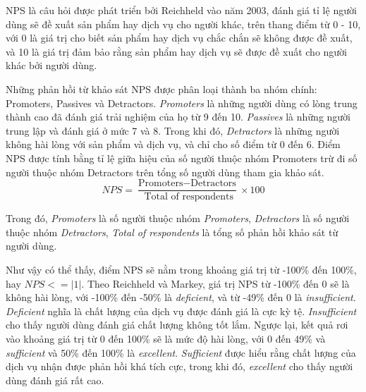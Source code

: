 NPS là câu hỏi được phát triển bởi Reichheld vào năm 2003, đánh giá tỉ lệ người dùng sẽ đề xuất sản phẩm hay dịch vụ cho người khác, trên thang điểm từ 0 - 10, với 0 là giá trị cho biết sản phẩm hay dịch vụ chắc chắn sẽ không được đề xuất, và 10 là giá trị đảm bảo rằng sản phẩm hay dịch vụ sẽ được đề xuất cho người khác bởi người dùng.
\par
Những phản hồi từ khảo sát NPS được phân loại thành ba nhóm chính: Promoters, Passives và Detractors. \emph{Promoters} là những người dùng có lòng trung thành cao đã đánh giá trải nghiệm của họ từ 9 đến 10. \emph{Passives} là những người trung lập và đánh giá ở mức 7 và 8. Trong khi đó, \emph{Detractors} là những người không hài lòng với sản phẩm và dịch vụ, và chỉ cho số điểm từ 0 đến 6. Điểm NPS được tính bằng tỉ lệ giữa hiệu của số người thuộc nhóm Promoters trừ đi số người thuộc nhóm Detractors trên tổng số người dùng tham gia khảo sát.
\[ NPS = \frac{\text{Promoters} - \text{Detractors}}{\text{ Total of respondents}} \times 100 \]
\par
Trong đó, \emph{Promoters} là số người thuộc nhóm \emph{Promoters}, \emph{Detractors} là số người thuộc nhóm \emph{Detractors}, \emph{Total of respondents} là tổng số phản hồi khảo sát từ người dùng.
\par
Như vậy có thể thấy, điểm NPS sẽ nằm trong khoảng giá trị từ -100\% đến 100\%, hay $NPS <= |1|$. Theo Reichheld và Markey, giá trị NPS từ -100\% đến 0 sẽ là không hài lòng, với -100\% đến -50\% là \emph{deficient}, và từ -49\% đến 0 là \emph{insufficient}. \emph{Deficient} nghĩa là chất lượng của dịch vụ được đánh giá là cực kỳ tệ. \emph{Insufficient} cho thấy người dùng đánh giá chất lượng không tốt lắm. Ngược lại, kết quả rơi vào khoảng giá trị từ 0 đến 100\% sẽ là mức độ hài lòng, với 0 đến 49\% và \emph{sufficient} và 50\% đến 100\% là \emph{excellent}. \emph{Sufficient} được hiểu rằng chất lượng của dịch vụ nhận được phản hồi khá tích cực, trong khi đó, \emph{excellent} cho thấy người dùng đánh giá rất cao.

